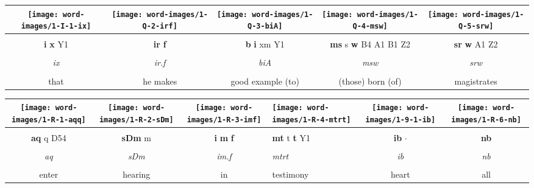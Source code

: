\begin{tabularx}{\linewidth}{ccccc}
	\hspace*{-1.5mm}\texttt{[image: word-images/1-I-1-ix]} &
	\hspace*{-6mm}\texttt{[image: word-images/1-Q-2-irf]} &
	\hspace*{-18mm}\texttt{[image: word-images/1-Q-3-biA]} &
	\hspace*{-14mm}\texttt{[image: word-images/1-Q-4-msw]} &
	\hspace*{-2mm}\texttt{[image: word-images/1-Q-5-srw]} \\
	\hline \\ 
	\textbf{i} \textbf{x} Y1 &
	\hspace*{-8mm}\textbf{ir} \textbf{f} &
	\hspace*{-14mm}\textbf{b} \textbf{i} xm Y1 &
	\hspace*{-14mm}\textbf{ms} s \textbf{w} B4 A1 B1 Z2 &
	\textbf{sr} \textbf{w} A1 Z2 \\
	\hline \\ 
	\textit{ix} & \hspace*{-8mm}\textit{ir.f} & \hspace*{-14mm}\textit{biA} & \hspace*{-14mm}\textit{msw} & \hspace*{-2mm}\textit{srw} \\
	\hline \\ 
	\hspace*{-4mm}that & \hspace*{-8mm}he makes & \hspace*{-3mm}good example (to) & \hspace*{-6mm}(those) born (of) & \hspace*{-2mm}magistrates
\end{tabularx}

\vspace{7.5mm}

\begin{tabularx}{\linewidth}{cccYcc}
	\texttt{[image: word-images/1-R-1-aqq]} &
	\texttt{[image: word-images/1-R-2-sDm]} &
	\texttt{[image: word-images/1-R-3-imf]} &
	\texttt{[image: word-images/1-R-4-mtrt]} &
	\texttt{[image: word-images/1-9-1-ib]} &
	\texttt{[image: word-images/1-R-6-nb]} \\
	\hline \\ 
	\textbf{aq} q D54 &
	\textbf{sDm} m &
	\textbf{i} \textbf{m} \textbf{f} &
	\hspace*{-6mm}\textbf{mt} t \textbf{t} Y1 &
	\textbf{ib} $\cdot$ &
	\textbf{nb} \\
	\hline \\ 
	\textit{aq} & \textit{sDm} & \textit{im.f} & \hspace*{-4mm}\textit{mtrt} & \textit{ib} & \textit{nb} \\
	\hline \\ 
	enter & hearing & in & \hspace*{-8mm}testimony & heart & all
\end{tabularx}

